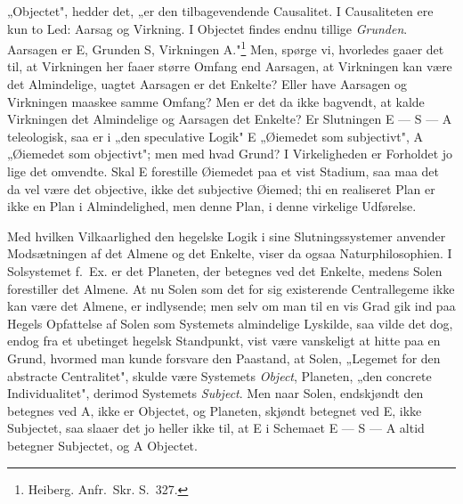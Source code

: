 \documentclass[12pt]{book}
\newcommand{\opage}[1]{\marginnote{\footnotesize\textit{[#1]}}}
\begin{document}
„Objectet", hedder det, „er den tilbagevendende Causalitet. I Causaliteten ere kun to Led: Aarsag og
Virkning. I Objectet findes endnu tillige \emph{Grunden}. Aarsagen er E, Grunden S, Virkningen
A."\footnote{Heiberg. Anfr.\ Skr. S.~327.} Men, spørge vi, hvorledes gaaer det til, at Virkningen her
faaer større Omfang end Aarsagen, at Virkningen kan være det Almindelige, uagtet Aarsagen er det
Enkelte? Eller have Aarsagen og Virkningen maaskee samme Omfang? Men er det da ikke bagvendt, at kalde
Virkningen det Almindelige og Aarsagen det Enkelte? Er Slutningen E — S — A teleologisk, saa er i „den
speculative Logik" E „Øiemedet som subjectivt", A „Øiemedet som objectivt"; men med hvad Grund? I
Virkeligheden er Forholdet jo lige det omvendte. Skal E forestille Øiemedet paa et vist Stadium,
\opage{432} saa maa det da vel være det objective, ikke det subjective Øiemed; thi en realiseret Plan er ikke en
Plan i Almindelighed, men denne Plan, i denne virkelige Udførelse.

Med hvilken Vilkaarlighed den hegelske Logik i sine Slutningssystemer anvender Modsætningen af det
Almene og det Enkelte, viser da ogsaa Naturphilosophien. I Solsystemet f.\ Ex. er det Planeten, der
betegnes ved det Enkelte, medens Solen forestiller det Almene. At nu Solen som det for sig
existerende Centrallegeme ikke kan være det Almene, er indlysende; men selv om man til en vis Grad gik
ind paa Hegels Opfattelse af Solen som Systemets almindelige Lyskilde, saa vilde det dog, endog fra et
ubetinget hegelsk Standpunkt, vist være vanskeligt at hitte paa en Grund, hvormed man kunde forsvare
den Paastand, at Solen, „Legemet for den abstracte Centralitet", skulde være Systemets \emph{Object},
Planeten, „den concrete Individualitet", derimod Systemets \emph{Subject}. Men naar Solen, endskjøndt
den betegnes ved A, ikke er Objectet, og Planeten, skjøndt betegnet ved E, ikke Subjectet, saa slaaer
det jo heller ikke til, at E i Schemaet E — S — A altid betegner Subjectet, og A Objectet.
\end{document}
